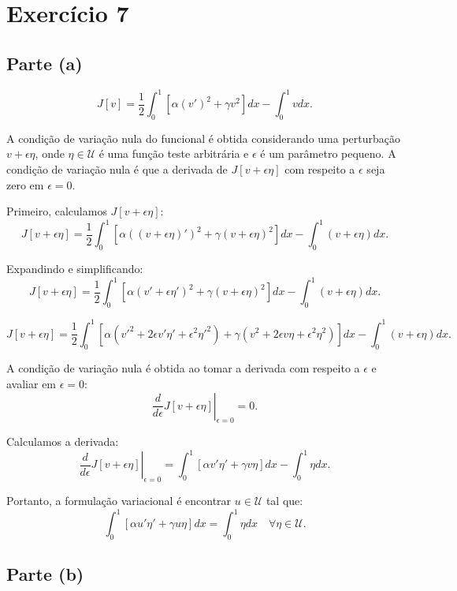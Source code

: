 \documentclass{article}
\begin{document}
\section{Exercício 7}

\subsection{Parte (a)}
\[
J[v] = \frac{1}{2} \int_0^1 \left[ \alpha (v')^2 + \gamma v^2 \right] dx - \int_0^1 v dx.
\]

A condição de variação nula do funcional é obtida considerando uma perturbação \( v + \epsilon \eta \), onde \( \eta \in \mathcal{U} \) é uma função teste arbitrária e \( \epsilon \) é um parâmetro pequeno. A condição de variação nula é que a derivada de \( J[v + \epsilon \eta] \) com respeito a \( \epsilon \) seja zero em \( \epsilon = 0 \).

Primeiro, calculamos \( J[v + \epsilon \eta] \):
\[
J[v + \epsilon \eta] = \frac{1}{2} \int_0^1 \left[ \alpha ((v + \epsilon \eta)')^2 + \gamma (v + \epsilon \eta)^2 \right] dx - \int_0^1 (v + \epsilon \eta) dx.
\]

Expandindo e simplificando:
\[
J[v + \epsilon \eta] = \frac{1}{2} \int_0^1 \left[ \alpha (v' + \epsilon \eta')^2 + \gamma (v + \epsilon \eta)^2 \right] dx - \int_0^1 (v + \epsilon \eta) dx.
\]

\[
J[v + \epsilon \eta] = \frac{1}{2} \int_0^1 \left[ \alpha (v'^2 + 2 \epsilon v' \eta' + \epsilon^2 \eta'^2) + \gamma (v^2 + 2 \epsilon v \eta + \epsilon^2 \eta^2) \right] dx - \int_0^1 (v + \epsilon \eta) dx.
\]

A condição de variação nula é obtida ao tomar a derivada com respeito a \( \epsilon \) e avaliar em \( \epsilon = 0 \):
\[
\left. \frac{d}{d\epsilon} J[v + \epsilon \eta] \right|_{\epsilon=0} = 0.
\]

Calculamos a derivada:
\[
\left. \frac{d}{d\epsilon} J[v + \epsilon \eta] \right|_{\epsilon=0} = \int_0^1 \left[ \alpha v' \eta' + \gamma v \eta \right] dx - \int_0^1 \eta dx.
\]

Portanto, a formulação variacional é encontrar \( u \in \mathcal{U} \) tal que:
\[
\int_0^1 \left[ \alpha u' \eta' + \gamma u \eta \right] dx = \int_0^1 \eta dx \quad \forall \eta \in \mathcal{U}.
\]

\subsection{Parte (b)}
\end{document}
